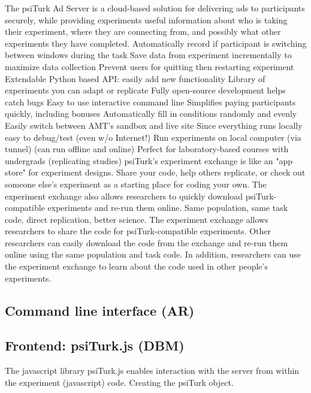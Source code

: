 \documentclass[jou,apacite]{apa6}
\begin{document}
The psiTurk Ad Server is a cloud-based solution for delivering ads to participants securely, while providing experiments useful information about who is taking their experiment, where they are connecting from, and possibly what other experiments they have completed.
Automatically record if participant is switching between windows during the task
Save data from experiment incrementally to maximize data collection
Prevent users for quitting then restarting experiment
Extendable Python based API: easily add new functionality
Library of experiments you can adapt or replicate
Fully open-source development helps catch bugs
Easy to use interactive command line
Simplifies paying participants quickly, including bonuses
Automatically fill in conditions randomly and evenly
Easily switch between AMT's sandbox and live site
Since everything runs locally easy to debug/test (even w/o Internet!)
Run experiments on local computer (via tunnel) (can run offline and online)
Perfect for laboratory-based courses with undergrads (replicating studies)
psiTurk's experiment exchange is like an "app store" for experiment designs. Share your code, help others replicate, or check out someone else's experiment as a starting place for coding your own. The experiment exchange also allows researchers to quickly download psiTurk-compatible experiments and re-run them online. Same population, same task code, direct replication, better science.
The experiment exchange allows researchers to share the code for psiTurk-compatible experiments. Other researchers can easily download the code from the exchange and re-run them online using the same population and task code. In addition, researchers can use the experiment exchange to learn about the code used in other people's experiments. 




\subsection{Command line interface (AR)}


\subsection{Frontend: psiTurk.js (DBM)}

The javascript library psiTurk.js enables interaction with the server from within the experiment (javascript) code.
Creating the psiTurk object.
\end{document}
